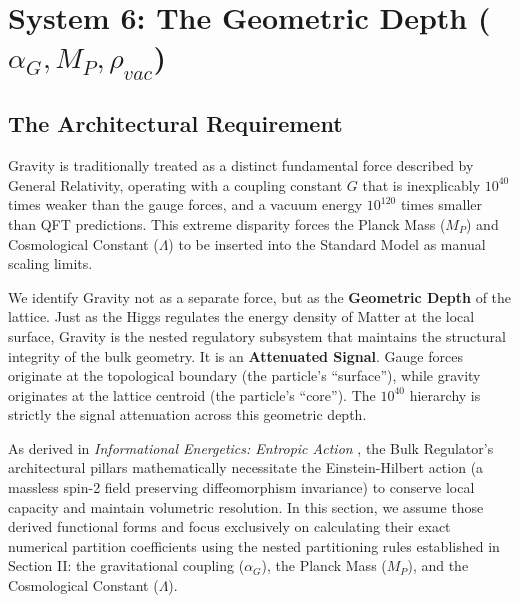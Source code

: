 \section{System 6: The Geometric Depth \texorpdfstring{($\alpha_G, M_P, \rho_{vac}$)}{(alphaG, MP, rhovac)}}
\label{sec:geometric_depth}





\subsection{The Architectural Requirement}
Gravity is traditionally treated as a distinct fundamental force described by General Relativity, operating with a coupling constant $G$ that is inexplicably $10^{40}$ times weaker than the gauge forces, and a vacuum energy $10^{120}$ times smaller than QFT predictions. This extreme disparity forces the Planck Mass ($M_P$) and Cosmological Constant ($\Lambda$) to be inserted into the Standard Model as manual scaling limits.

We identify Gravity not as a separate force, but as the \textbf{Geometric Depth} of the lattice. Just as the Higgs regulates the energy density of Matter at the local surface, Gravity is the nested regulatory subsystem that maintains the structural integrity of the bulk geometry. It is an \textbf{Attenuated Signal}. Gauge forces originate at the topological boundary (the particle's ``surface''), while gravity originates at the lattice centroid (the particle's ``core''). The $10^{40}$ hierarchy is strictly the signal attenuation across this geometric depth.

As derived in \textit{Informational Energetics: Entropic Action} \cite{meyer_ieaction_2026}, the Bulk Regulator's architectural pillars mathematically necessitate the Einstein-Hilbert action (a massless spin-2 field preserving diffeomorphism invariance) to conserve local capacity and maintain volumetric resolution. In this section, we assume those derived functional forms and focus exclusively on calculating their exact numerical partition coefficients using the nested partitioning rules established in Section II: the gravitational coupling ($\alpha_G$), the Planck Mass ($M_P$), and the Cosmological Constant ($\Lambda$).

